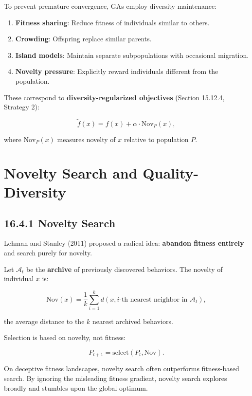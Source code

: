 To prevent premature convergence, GAs employ diversity maintenance:

\begin{enumerate}
\item \textbf{Fitness sharing}: Reduce fitness of individuals similar to others.
\item \textbf{Crowding}: Offspring replace similar parents.
\item \textbf{Island models}: Maintain separate subpopulations with occasional migration.
\item \textbf{Novelty pressure}: Explicitly reward individuals different from the population.
\end{enumerate}

These correspond to \textbf{diversity-regularized objectives} (Section 15.12.4, Strategy 2):

\[\tilde{f}(x) = f(x) + \alpha \cdot \mathrm{Nov}_P(x),\]

where $\mathrm{Nov}_P(x)$ measures novelty of $x$ relative to population $P$.



\section{Novelty Search and Quality-Diversity}

\subsection{16.4.1 Novelty Search}

Lehman and Stanley (2011) proposed a radical idea: \textbf{abandon fitness entirely} and search purely for novelty.

\begin{definition}
Let $\mathcal{A}_t$ be the \textbf{archive} of previously discovered behaviors. The novelty of individual $x$ is:

\[\mathrm{Nov}(x) = \frac{1}{k} \sum_{i=1}^{k} d(x, \text{$i$-th nearest neighbor in } \mathcal{A}_t),\]

the average distance to the $k$ nearest archived behaviors.

Selection is based on novelty, not fitness:

\[P_{t+1} = \text{select}(P_t, \mathrm{Nov}).\]
\end{definition}

\begin{theorem}
On deceptive fitness landscapes, novelty search often outperforms fitness-based search. By ignoring the misleading fitness gradient, novelty search explores broadly and stumbles upon the global optimum.
\end{theorem}

